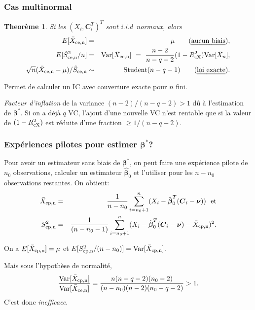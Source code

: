 \documentclass[t,usepdftitle=false]{beamer}
\def\bC{\boldsymbol{C}}
\def\bbeta{\boldsymbol{\beta}}
\def\bnu{\boldsymbol{\nu}}
\def\Var{\mbox{Var}}
\newtheorem{thm}{Theorème}
\begin{document}
\begin{frame}
\frametitle{Cas multinormal}

\begin{thm}
Si les $(X_i,\bC_i^T)^T$ sont i.i.d\ normaux, alors
\begin{eqnarray*}
 E[\bar X_{\rm ce,n}] &=& \mu \qquad \mbox{(\emph{aucun biais})}, \\
 E[\tilde S^2_{\rm ce,n}/n]  &=& \Var[\bar X_{\rm ce,n}] 
     ~=~ {n-2\over n-q-2} (1-R_{\rm c\rm X}^2) \Var[\bar X_n],\\
 \sqrt{n}(\bar X_{\rm ce,n} - \mu)/\tilde S_{\rm ce,n} 
   &\sim& \mbox{Student}(n-q-1)  \qquad \mbox{(\emph{loi exacte})}.
\end{eqnarray*}

\mbox{}

\end{thm}
Permet de calculer un IC avec couverture exacte pour $n$ fini.

\emph{Facteur d'inflation} de la variance $(n-2)/(n-q-2) > 1$ 
d\^u \`a l'estimation de $\bbeta^*$.
Si on a déj\`a ${q}$ VC, l'ajout d'une nouvelle VC n'est rentable que
si la valeur de $(1-R_{\rm c\rm X}^2)$ est réduite d'une fraction
$\ge 1/(n-q-2)$.
  
\end{frame}

\begin{frame}
\frametitle{Expériences pilotes pour estimer $\bbeta^*$?}

Pour avoir un estimateur sans biais de $\bbeta^*$,
on peut faire une expérience pilote de ${n_0}$ observations,
calculer un estimateur ${\hat{\bbeta}_0}$ et l'utiliser pour 
les $n-n_0$ observations restantes.  On obtient:
\begin{eqnarray*}
 \bar X_{\rm cp,n} &=& {1\over n-n_0} \sum_{i=n_0+1}^n
                     (X_i - \hat{\bbeta}_0^T (\bC_i - \bnu)) 
  \mbox { \ et} \\
 S^2_{\rm cp,n}    &=& {1\over (n-n_0-1)}
   \sum_{i=n_0+1}^n (X_i - \hat{\bbeta}_0^T 
           (\bC_i - \bnu) - \bar X_{\rm cp,n})^2.
\end{eqnarray*}

\mbox{}

On a $E[\bar X_{\rm cp,n}] = \mu$ et 
$E[S^2_{\rm cp,n}/(n-n_0)] = \Var[\bar X_{\rm cp,n}]$.

Mais sous l'hypothèse de normalité,
 $$ {\Var[\bar X_{\rm cp,n}] \over \Var[\bar X_{\rm ce,n}]} =
    {n(n-q-2)(n_0-2) \over (n-n_0)(n-2)(n_0-q-2)} > 1. $$
C'est donc \emph{inefficace}.

\end{frame}
\end{document}
